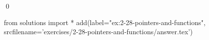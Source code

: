 
\begin{ex}
  \label{ex:2-28-pointers-and-functions}
  
  \qed
\end{ex}
\begin{python0}
from solutions import *
add(label="ex:2-28-pointers-and-functions",
    srcfilename='exercises/2-28-pointers-and-functions/answer.tex')
\end{python0}
